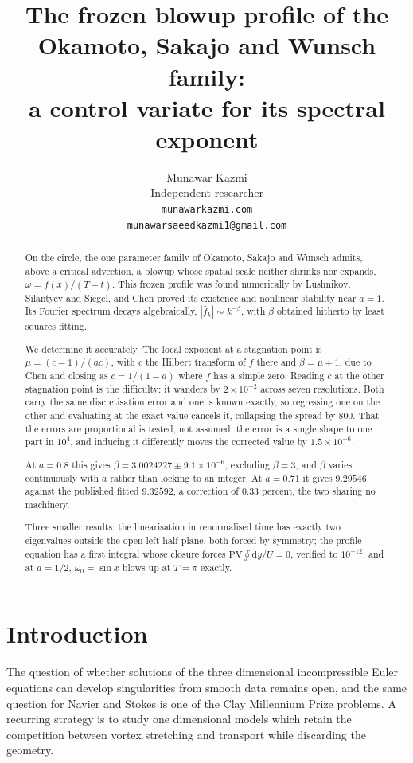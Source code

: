 \documentclass[11pt]{article}
\title{The frozen blowup profile of the Okamoto, Sakajo and Wunsch family:\\
a control variate for its spectral exponent}
\author{Munawar Kazmi\\[2pt]
  \normalsize Independent researcher\\
  \normalsize \texttt{munawarkazmi.com}\\
  \normalsize \texttt{munawarsaeedkazmi1@gmail.com}}
\date{}
\theoremstyle{definition}
\newcommand{\abs}[1]{\left\lvert #1 \right\rvert}
\begin{document}
\maketitle

\begin{abstract}
On the circle, the one parameter family of Okamoto, Sakajo and Wunsch admits,
above a critical advection, a blowup whose spatial scale neither shrinks nor
expands, $\omega = f(x)/(T-t)$. This frozen profile was found numerically by
Lushnikov, Silantyev and Siegel, and Chen proved its existence and nonlinear
stability near $a=1$. Its Fourier spectrum decays algebraically,
$\abs{\hat f_k}\sim k^{-\beta}$, with $\beta$ obtained hitherto by least
squares fitting.

We determine it accurately. The local exponent at a stagnation point is
$\mu = (c-1)/(ac)$, with $c$ the Hilbert transform of $f$ there and
$\beta = \mu+1$, due to Chen and closing as $c = 1/(1-a)$ where $f$ has a
simple zero. Reading $c$ at the other stagnation point is the difficulty:
it wanders by $2\times10^{-2}$ across seven resolutions. Both carry the same
discretisation error and one is known exactly, so regressing one on the other
and evaluating at the exact value cancels it, collapsing the spread by $800$.
That the errors are proportional is tested, not assumed: the error is a single
shape to one part in $10^4$, and inducing it differently moves the corrected
value by $1.5\times10^{-6}$.

At $a=0.8$ this gives $\beta = 3.0024227\pm9.1\times10^{-6}$, excluding
$\beta=3$, and $\beta$ varies continuously with $a$ rather than locking to an
integer. At $a=0.71$ it gives $9.29546$ against the published fitted
$9.32592$, a correction of $0.33$ percent, the two sharing no
machinery.

Three smaller results: the linearisation in renormalised time has
exactly two eigenvalues outside the open left half plane, both forced by
symmetry; the profile equation has a first integral whose closure forces
$\mathrm{PV}\oint \mathrm{d}y/U = 0$, verified to $10^{-12}$; and at $a=1/2$,
$\omega_0 = \sin x$ blows up at $T = \pi$ exactly.
\end{abstract}

\section{Introduction}

The question of whether solutions of the three dimensional incompressible Euler
equations can develop singularities from smooth data remains open, and the same
question for Navier and Stokes is one of the Clay Millennium Prize problems. A
recurring strategy is to study one dimensional models which retain the
competition between vortex stretching and transport while discarding the
geometry.
\end{document}
